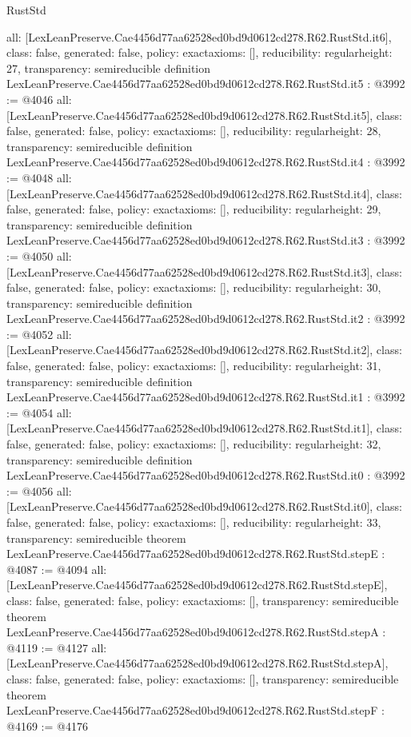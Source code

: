 \begin{lexlean}{RustStd}
\begin{coremodule}
{  all: [LexLeanPreserve.Cae4456d77aa62528ed0bd9d0612cd278.R62.RustStd.it6],
  class: false,
  generated: false,
  policy: exact{axioms: []},
  reducibility: regular{height: 27},
  transparency: semireducible
}
definition LexLeanPreserve.Cae4456d77aa62528ed0bd9d0612cd278.R62.RustStd.it5 : @3992 := @4046 {
  all: [LexLeanPreserve.Cae4456d77aa62528ed0bd9d0612cd278.R62.RustStd.it5],
  class: false,
  generated: false,
  policy: exact{axioms: []},
  reducibility: regular{height: 28},
  transparency: semireducible
}
definition LexLeanPreserve.Cae4456d77aa62528ed0bd9d0612cd278.R62.RustStd.it4 : @3992 := @4048 {
  all: [LexLeanPreserve.Cae4456d77aa62528ed0bd9d0612cd278.R62.RustStd.it4],
  class: false,
  generated: false,
  policy: exact{axioms: []},
  reducibility: regular{height: 29},
  transparency: semireducible
}
definition LexLeanPreserve.Cae4456d77aa62528ed0bd9d0612cd278.R62.RustStd.it3 : @3992 := @4050 {
  all: [LexLeanPreserve.Cae4456d77aa62528ed0bd9d0612cd278.R62.RustStd.it3],
  class: false,
  generated: false,
  policy: exact{axioms: []},
  reducibility: regular{height: 30},
  transparency: semireducible
}
definition LexLeanPreserve.Cae4456d77aa62528ed0bd9d0612cd278.R62.RustStd.it2 : @3992 := @4052 {
  all: [LexLeanPreserve.Cae4456d77aa62528ed0bd9d0612cd278.R62.RustStd.it2],
  class: false,
  generated: false,
  policy: exact{axioms: []},
  reducibility: regular{height: 31},
  transparency: semireducible
}
definition LexLeanPreserve.Cae4456d77aa62528ed0bd9d0612cd278.R62.RustStd.it1 : @3992 := @4054 {
  all: [LexLeanPreserve.Cae4456d77aa62528ed0bd9d0612cd278.R62.RustStd.it1],
  class: false,
  generated: false,
  policy: exact{axioms: []},
  reducibility: regular{height: 32},
  transparency: semireducible
}
definition LexLeanPreserve.Cae4456d77aa62528ed0bd9d0612cd278.R62.RustStd.it0 : @3992 := @4056 {
  all: [LexLeanPreserve.Cae4456d77aa62528ed0bd9d0612cd278.R62.RustStd.it0],
  class: false,
  generated: false,
  policy: exact{axioms: []},
  reducibility: regular{height: 33},
  transparency: semireducible
}
theorem LexLeanPreserve.Cae4456d77aa62528ed0bd9d0612cd278.R62.RustStd.stepE : @4087 := @4094 {
  all: [LexLeanPreserve.Cae4456d77aa62528ed0bd9d0612cd278.R62.RustStd.stepE],
  class: false,
  generated: false,
  policy: exact{axioms: []},
  transparency: semireducible
}
theorem LexLeanPreserve.Cae4456d77aa62528ed0bd9d0612cd278.R62.RustStd.stepA : @4119 := @4127 {
  all: [LexLeanPreserve.Cae4456d77aa62528ed0bd9d0612cd278.R62.RustStd.stepA],
  class: false,
  generated: false,
  policy: exact{axioms: []},
  transparency: semireducible
}
theorem LexLeanPreserve.Cae4456d77aa62528ed0bd9d0612cd278.R62.RustStd.stepF : @4169 := @4176 {
}
\end{coremodule}
\end{lexlean}
